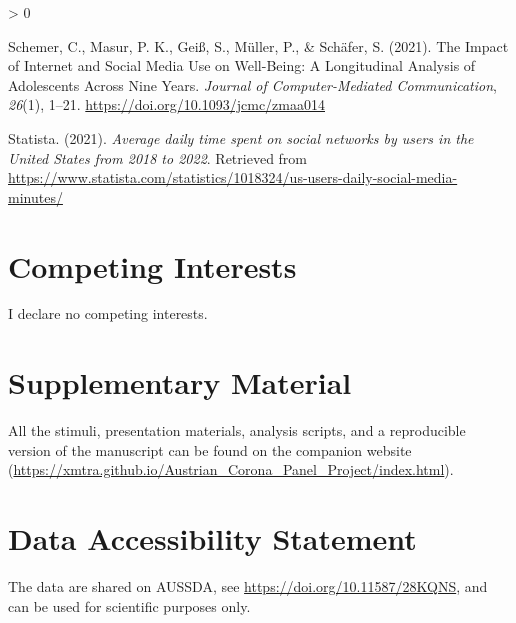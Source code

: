 \documentclass[
  english,
  man,mask,floatsintext]{apa6}
\newlength{\cslhangindent}
\newenvironment{CSLReferences}[2] %
 {%
  \setlength{\parindent}{0pt}
  \ifodd #1 \everypar{\setlength{\hangindent}{\cslhangindent}}\ignorespaces\fi
  \ifnum #2 > 0
  \setlength{\parskip}{#2\baselineskip}
  \fi
 }%
 {}
\begin{document}
\begin{CSLReferences}{1}{0}
\leavevmode\hypertarget{ref-schemerImpactInternetSocial2021}{}%
Schemer, C., Masur, P. K., Geiß, S., Müller, P., \& Schäfer, S. (2021). The {Impact} of {Internet} and {Social} {Media} {Use} on {Well}-{Being}: {A} {Longitudinal} {Analysis} of {Adolescents} {Across} {Nine} {Years}. \emph{Journal of Computer-Mediated Communication}, \emph{26}(1), 1--21. \url{https://doi.org/10.1093/jcmc/zmaa014}

\leavevmode\hypertarget{ref-statistaAverageDailyTime2021}{}%
Statista. (2021). \emph{Average daily time spent on social networks by users in the {United} {States} from 2018 to 2022}. Retrieved from \url{https://www.statista.com/statistics/1018324/us-users-daily-social-media-minutes/}

\end{CSLReferences}

\hypertarget{competing-interests}{%
\section{Competing Interests}\label{competing-interests}}

I declare no competing interests.

\hypertarget{supplementary-material}{%
\section{Supplementary Material}\label{supplementary-material}}

All the stimuli, presentation materials, analysis scripts, and a reproducible version of the manuscript can be found on the companion website (\url{https://xmtra.github.io/Austrian_Corona_Panel_Project/index.html}).

\hypertarget{data-accessibility-statement}{%
\section{Data Accessibility Statement}\label{data-accessibility-statement}}

The data are shared on AUSSDA, see \url{https://doi.org/10.11587/28KQNS}, and can be used for scientific purposes only.
\end{document}
